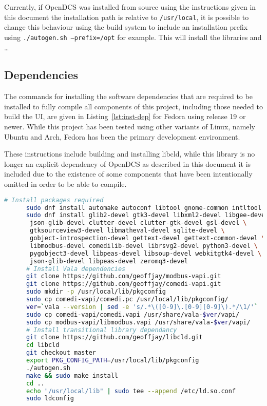       Currently, if OpenDCS was installed from source using the instructions
      given in this document the installation path is relative to
      \texttt{/usr/local}, it is possible to change this behaviour using the
      build system to include an installation prefix using
      \texttt{./autogen.sh --prefix=/opt} for example. This will install
      the libraries and \ldots

  \subsection{Dependencies}\label{sec:inst-dep}

    The commands for installing the software dependencies that are required to
    be installed to fully compile all components of this project, including
    those needed to build the UI, are given in Listing~\ref{lst:inst-dep} for
    Fedora using release 19 or newer.  While this project has been tested using
    other variants of Linux, namely Ubuntu and Arch, Fedora has been the
    primary development environment.

    These instructions include building and installing libcld, while this
    library is no longer an explicit dependency of OpenDCS as described in this
    document it is included due to the existence of some components that have
    been intentionally omitted in order to be able to compile.

    \begin{lstlisting}[language=bash,
                       caption={Installation Dependencies},
                       label={lst:inst-dep}]
      # Install packages required
      sudo dnf install automake autoconf libtool gnome-common intltool gcc vala
      sudo dnf install glib2-devel gtk3-devel libxml2-devel libgee-devel \
       json-glib-devel clutter-devel clutter-gtk-devel gsl-devel \
       gtksourceview3-devel libmatheval-devel sqlite-devel \
       gobject-introspection-devel gettext-devel gettext-common-devel \
       libmodbus-devel comedilib-devel librsvg2-devel python3-devel \
       pygobject3-devel libpeas-devel libsoup-devel webkitgtk4-devel \
       json-glib-devel libpeas-devel zeromq3-devel
      # Install Vala dependencies
      git clone https://github.com/geoffjay/modbus-vapi.git
      git clone https://github.com/geoffjay/comedi-vapi.git
      sudo mkdir -p /usr/local/lib/pkgconfig
      sudo cp comedi-vapi/comedi.pc /usr/local/lib/pkgconfig/
      ver=`vala --version | sed -e 's/.*\([0-9]\.[0-9][0-9]\).*/\1/'`
      sudo cp comedi-vapi/comedi.vapi /usr/share/vala-$ver/vapi/
      sudo cp modbus-vapi/libmodbus.vapi /usr/share/vala-$ver/vapi/
      # Install transitional library dependancy
      git clone https://github.com/geoffjay/libcld.git
      cd libcld
      git checkout master
      export PKG_CONFIG_PATH=/usr/local/lib/pkgconfig
      ./autogen.sh
      make && sudo make install
      cd ..
      echo "/usr/local/lib" | sudo tee --append /etc/ld.so.conf
      sudo ldconfig
    \end{lstlisting}

